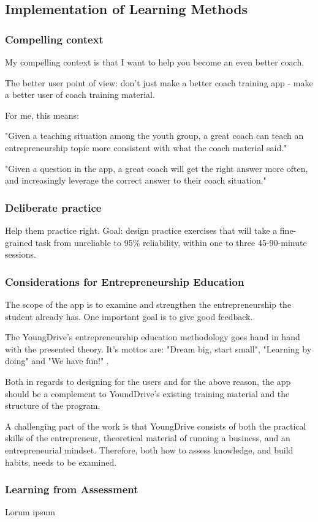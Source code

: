 \subsection{Implementation of Learning Methods}

\subsubsection{Compelling context}
My compelling context is that I want to help you become an even better coach.

The better user point of view: don’t just make a better coach training app - make a better user of coach training material.

For me, this means:

"Given a teaching situation among the youth group, a great coach can teach an entrepreneurship topic more consistent with what the coach material said."

"Given a question in the app, a great coach will get the right answer more often, and increasingly leverage the correct answer to their coach situation."

\subsubsection{Deliberate practice}

Help them practice right. Goal: design practice exercises that will take a fine-grained task from unreliable to 95\% reliability, within one to three 45-90-minute sessions.

\subsubsection{Considerations for Entrepreneurship Education}
The scope of the app is to examine and strengthen the entrepreneurship the student already has. One important goal is to give good feedback.

The YoungDrive's entrepreneurship education methodology goes hand in hand with the presented theory. It's mottos are: "Dream big, start small", "Learning by doing" and "We have fun!" \cite{youngdrive}.

Both in regards to designing for the users and for the above reason, the app should be a complement to YoundDrive's existing training material and the structure of the program.

A challenging part of the work is that YoungDrive consists of both the practical skills of the entrepreneur, theoretical material of running a business, and an entrepreneurial mindset. Therefore, both how to assess knowledge, and build habits, needs to be examined.

\subsubsection{Learning from Assessment}

Lorum ipsum

